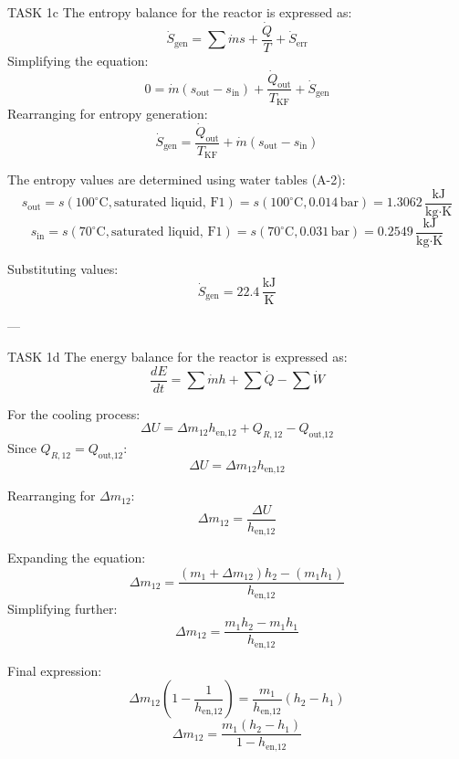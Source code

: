 TASK 1c  
The entropy balance for the reactor is expressed as:  
\[
\dot{S}_{\text{gen}} = \sum \dot{m} s + \frac{\dot{Q}}{T} + \dot{S}_{\text{err}}
\]  
Simplifying the equation:  
\[
0 = \dot{m} (s_{\text{out}} - s_{\text{in}}) + \frac{\dot{Q}_{\text{out}}}{T_{\text{KF}}} + \dot{S}_{\text{gen}}
\]  
Rearranging for entropy generation:  
\[
\dot{S}_{\text{gen}} = \frac{\dot{Q}_{\text{out}}}{T_{\text{KF}}} + \dot{m} (s_{\text{out}} - s_{\text{in}})
\]  

The entropy values are determined using water tables (A-2):  
\[
s_{\text{out}} = s(100^\circ\text{C}, \text{saturated liquid, F1}) = s(100^\circ\text{C}, 0.014 \, \text{bar}) = 1.3062 \, \frac{\text{kJ}}{\text{kg·K}}
\]  
\[
s_{\text{in}} = s(70^\circ\text{C}, \text{saturated liquid, F1}) = s(70^\circ\text{C}, 0.031 \, \text{bar}) = 0.2549 \, \frac{\text{kJ}}{\text{kg·K}}
\]  

Substituting values:  
\[
\dot{S}_{\text{gen}} = 22.4 \, \frac{\text{kJ}}{\text{K}}
\]  

---

TASK 1d  
The energy balance for the reactor is expressed as:  
\[
\frac{dE}{dt} = \sum \dot{m} h + \sum \dot{Q} - \sum \dot{W}
\]  

For the cooling process:  
\[
\Delta U = \Delta m_{12} h_{\text{en,12}} + Q_{R,12} - Q_{\text{out,12}}
\]  
Since \( Q_{R,12} = Q_{\text{out,12}} \):  
\[
\Delta U = \Delta m_{12} h_{\text{en,12}}
\]  

Rearranging for \( \Delta m_{12} \):  
\[
\Delta m_{12} = \frac{\Delta U}{h_{\text{en,12}}}
\]  

Expanding the equation:  
\[
\Delta m_{12} = \frac{(m_1 + \Delta m_{12}) h_2 - (m_1 h_1)}{h_{\text{en,12}}}
\]  
Simplifying further:  
\[
\Delta m_{12} = \frac{m_1 h_2 - m_1 h_1}{h_{\text{en,12}}}
\]  

Final expression:  
\[
\Delta m_{12} \left( 1 - \frac{1}{h_{\text{en,12}}} \right) = \frac{m_1}{h_{\text{en,12}}} (h_2 - h_1)
\]  
\[
\Delta m_{12} = \frac{m_1 (h_2 - h_1)}{1 - h_{\text{en,12}}}
\]